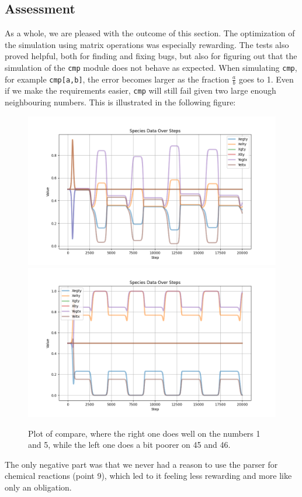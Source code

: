 \subsection{Assessment}
As a whole, we are pleased with the outcome of this section. The optimization of the simulation using matrix operations was especially rewarding. The tests also proved helpful, both for finding and fixing bugs, but also for figuring out that the simulation of the \texttt{cmp} module does not behave as expected. When simulating \texttt{cmp}, for example \texttt{cmp[a,b]}, the error becomes larger as the fraction $\frac{a}{b}$ goes to 1. Even if we make the requirements easier, \texttt{cmp} will still fail given two large enough neighbouring numbers. This is illustrated in the following figure:
\begin{figure}[H]
    \centering
    \includegraphics[scale=0.22]{report/figures/cmpbad.png}
    \includegraphics[scale=0.22]{report/figures/cmpgood.png}
    \caption{Plot of compare, where the right one does well on the numbers 1 and 5, while the left one does a bit poorer on 45 and 46.}
\end{figure}

The only negative part was that we never had a reason to use the parser for chemical reactions (point 9), which led to it feeling less rewarding and more like only an obligation.
